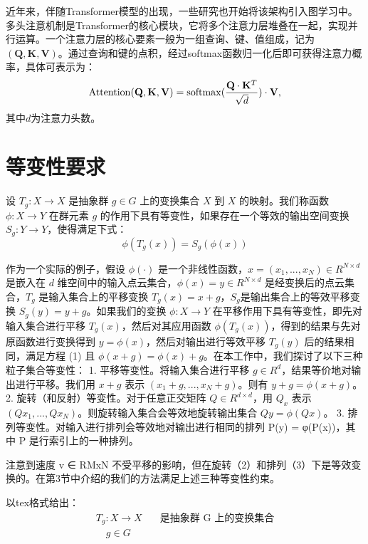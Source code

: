 近年来，伴随Transformer模型的出现，一些研究也开始将该架构引入图学习中。多头注意机制是Transformer的核心模块，它将多个注意力层堆叠在一起，实现并行运算。一个注意力层的核心要素一般为一组查询、键、值组成，记为$(\mathbf{Q}, \mathbf{K}, \mathbf{V})$。通过查询和键的点积，经过softmax函数归一化后即可获得注意力概率，具体可表示为：
\begin{eqnarray}
    {\rm Attention}(\mathbf{Q}, \mathbf{K}, \mathbf{V}) = {\rm softmax}(\frac{\mathbf{Q} \cdot \mathbf{K}^T}{\sqrt{d}}) \cdot \mathbf{V},
\end{eqnarray}
其中$d$为注意力头数。

\section{等变性要求}

设 $T_g: X \to X$ 是抽象群 $g \in G$ 上的变换集合 $X$ 到 $X$ 的映射。我们称函数 $\phi: X \to Y$ 在群元素 $g$ 的作用下具有等变性，如果存在一个等效的输出空间变换 $S_g: Y \to Y$，使得满足下式：
\begin{equation}
    \phi (T_g(x)) = S_g(\phi (x))
\end{equation}

作为一个实际的例子，假设 $\phi (\cdot)$ 是一个非线性函数，$x = (x_1, ..., x_N) \in R^{N \times d}$ 是嵌入在 $d$ 维空间中的输入点云集合，$\phi (x) = y \in R^{N \times d}$ 是经变换后的点云集合，$T_g$ 是输入集合上的平移变换 $T_g (x) = x + g$，$S_g$是输出集合上的等效平移变换 $S_g(y) = y + g$。如果我们的变换 $\phi : X \to Y$ 在平移作用下具有等变性，即先对输入集合进行平移 $T_g(x)$，然后对其应用函数 $\phi(T_g(x))$，得到的结果与先对原函数进行变换得到 $y = \phi(x)$，然后对输出进行等效平移 $T_g(y)$ 后的结果相同，满足方程 (1) 且 $\phi (x+g) = \phi (x) + g$。在本工作中，我们探讨了以下三种粒子集合等变性：
1. 平移等变性。将输入集合进行平移 $g \in R^d$，结果等价地对输出进行平移。我们用 $x + g$ 表示 $(x_1+g, ..., x_N + g)$。则有 $y+g = \phi (x+g)$。
2. 旋转（和反射）等变性。对于任意正交矩阵 $Q \in R^{d \times d}$，用 $Q_x$ 表示 $(Qx_1, ..., Qx_N)$。则旋转输入集合会等效地旋转输出集合 $Qy = \phi(Qx)$。
3. 排列等变性。对输入进行排列会等效地对输出进行相同的排列 P(y) = φ(P(x))，其中 P 是行索引上的一种排列。

注意到速度 v ∈ RMxN 不受平移的影响，但在旋转（2）和排列（3）下是等效变换的。在第3节中介绍的我们的方法满足上述三种等变性约束。

以tex格式给出：
\begin{align*}
T_g: X \rightarrow X & \quad \text{是抽象群 G 上的变换集合} \\
\quad g \in G
\end{align*}

